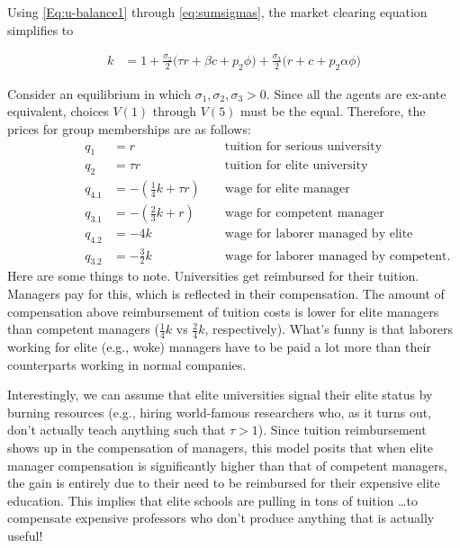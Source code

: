 \documentclass[12pt,letterpaper]{article}
\begin{document}
	Using \eqref{Eq:u-balance1} through \eqref{eq:sumsigmas}, the market clearing equation simplifies to
	
	\begin{align}
		k&=1+\frac{\sigma_2}{2}
		\Big(
		\tau r + \beta c + p_2\phi
		\Big) 
		+\frac{\sigma_3}{2}
		\Big(
		r + c + p_2\alpha\phi
		\Big)\label{MktClear}
	\end{align}
	
	Consider an equilibrium in which $\sigma_1,\sigma_2,\sigma_3>0$. 
	Since all the agents are ex-ante equivalent, choices $V(1)$ through $V(5)$ must be the equal.
	Therefore, the prices for group memberships are as follows:
	\begin{align*}
	\phantom{====}	q_1&=r&&\text{ tuition for serious university}\\
	\phantom{====}	q_2&=\tau r&&\text{ tuition for elite university}\\
	\phantom{====}	q_{4.1}&=-(\frac{1}{4}k+\tau r)&&\text{ wage for elite manager}\\
	\phantom{====}	q_{3.1}&=-(\frac{2}{3}k+r)&&\text{ wage for competent manager}\\
	\phantom{====}	q_{4.2}&=-4k&&\text{ wage for laborer managed by elite}\\
	\phantom{====}	q_{3.2}&=-\frac{3}{2}k&&\text{ wage for laborer managed by competent}.		
	\end{align*}
	Here are some things to note. 
	Universities get reimbursed for their tuition.
	Managers pay for this, which is reflected in their compensation. 
	The amount of compensation above reimbursement of tuition costs is lower for elite managers than competent managers ($\frac{1}{4}k$ vs $\frac{2}{4}k$, respectively).
	What's funny is that laborers working for elite (e.g., woke) managers have to be paid a lot more than their counterparts working in normal companies.
	
	Interestingly, we can assume that elite universities signal their elite status by burning resources (e.g., hiring world-famous researchers who, as it turns out, don't actually teach anything such that $\tau>1$).
	Since tuition reimbursement shows up in the compensation of managers, this model posits that when elite manager compensation is significantly higher than that of competent managers, the gain is entirely due to their need to be reimbursed for their expensive elite education.
	This implies that elite schools are pulling in tons of tuition \ldots to compensate expensive professors who don't produce anything that is actually useful! 
	
\end{document}
